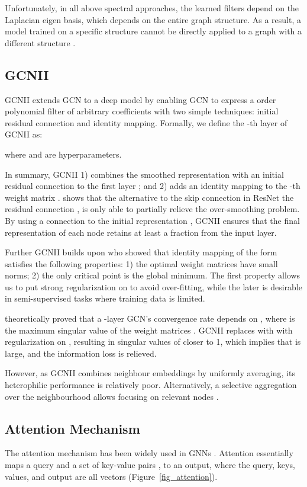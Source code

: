 \documentclass{article}
\begin{document}
Unfortunately, in all above spectral approaches, the learned filters depend on the Laplacian eigen basis, which depends on the entire graph structure. As a result, a model trained on a specific structure cannot be directly applied to a graph with a different structure \cite{velivckovic2018graph}.

\subsection{GCNII} \label{GCNII}
GCNII \cite{chen2020simple} extends GCN to a deep model by enabling GCN to express a  order polynomial filter of arbitrary coefficients with two simple techniques: initial residual connection and identity mapping. Formally, we define the -th layer of GCNII as:
 
where  and  are hyperparameters. 

In summary, GCNII 1) combines the smoothed representation  with an initial residual connection to the first layer ; and 2) adds an identity mapping  to the -th weight matrix . \citet{chen2020simple} shows that the alternative to the skip connection in ResNet \cite{he2016identity} the residual connection \cite{kipf2016semi}, is only able to partially relieve the over-smoothing problem. By using a connection to the initial representation , GCNII ensures that the final representation of each node retains at least a  fraction from the input layer. 

Further GCNII builds upon \citet{hardt2016identity} who showed that identity mapping of the form  satisfies the following properties: 1) the optimal weight matrices  have small norms; 2) the only critical point is the global minimum. The first property allows us to put strong regularization on  to avoid over-fitting, while the later is desirable in semi-supervised tasks where training data is limited. 

\citet{oono2019graph} theoretically proved that a -layer GCN's convergence rate depends on , where  is the maximum singular value of the weight matrices . GCNII replaces  with  with regularization on , resulting in singular values of  closer to 1, which implies that  is large, and the information loss is relieved. 

However, as GCNII combines neighbour embeddings by uniformly averaging, its heterophilic performance is relatively poor. Alternatively, a selective aggregation over the neighbourhood allows focusing on relevant nodes \cite{zhu2020beyond}.

\subsection{Attention Mechanism}
The attention mechanism \cite{vaswani2017attention} has been widely used in GNNs \cite{chen2020simple,brody2021attentive, velivckovic2018graph}. Attention essentially maps a query  and a set of key-value pairs ,  to an output, where the query, keys, values, and output are all vectors (Figure~\ref{fig_attention}).
\end{document}
